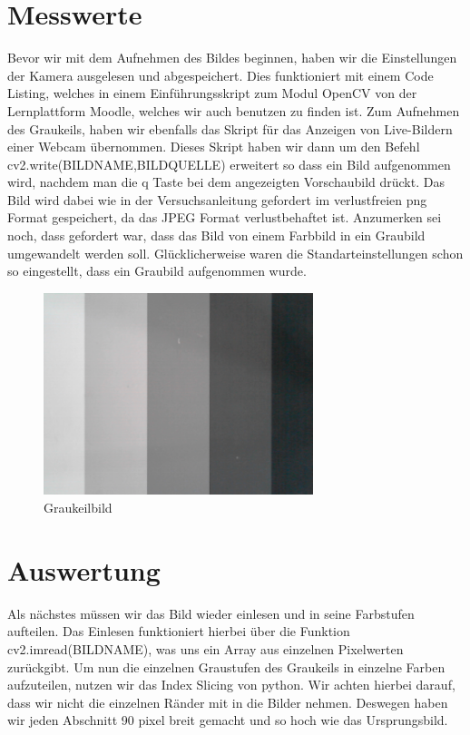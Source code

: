 \documentclass[TGAI_Laborbericht.tex]{subfiles}
\begin{document}
\section{Messwerte}
\label{chap:VERSUCH_1_MESSWERTE}

Bevor wir mit dem Aufnehmen des Bildes beginnen, haben wir die Einstellungen der Kamera ausgelesen und abgespeichert. Dies funktioniert mit einem Code Listing, welches in einem Einführungsskript zum Modul OpenCV von der Lernplattform Moodle, welches wir auch benutzen zu finden ist. Zum Aufnehmen des Graukeils, haben wir ebenfalls das Skript für das Anzeigen von Live-Bildern einer Webcam übernommen. Dieses Skript haben wir dann um den Befehl cv2.write(BILDNAME,BILDQUELLE) erweitert so dass ein Bild aufgenommen wird, nachdem man die q Taste bei dem angezeigten Vorschaubild drückt. Das Bild wird dabei wie in der Versuchsanleitung gefordert im verlustfreien png Format gespeichert, da das JPEG Format verlustbehaftet ist. Anzumerken sei noch, dass gefordert war, dass das Bild von einem Farbbild in ein Graubild umgewandelt werden soll. Glücklicherweise waren die Standarteinstellungen schon so eingestellt, dass ein Graubild aufgenommen wurde.

\begin{figure}[H]
	\includegraphics[width=0.7\textwidth]{media/graubild.png}
	\caption{Graukeilbild}
	\label{fig:Graukeilbild}
\end{figure}

\section{Auswertung}
\label{chap:VERSUCH_1_AUSWERTUNG}

Als nächstes müssen wir das Bild wieder einlesen und in seine Farbstufen aufteilen. Das Einlesen funktioniert hierbei über die Funktion  cv2.imread(BILDNAME), was uns ein Array aus einzelnen Pixelwerten zurückgibt. Um nun die einzelnen Graustufen des Graukeils in einzelne Farben aufzuteilen, nutzen wir das Index Slicing von python. Wir achten hierbei darauf, dass wir nicht die einzelnen Ränder mit in die Bilder nehmen. Deswegen haben wir jeden Abschnitt 90 pixel breit gemacht und so hoch wie das Ursprungsbild.
\end{document}
